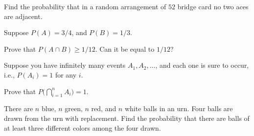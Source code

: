 \begin{problem}[Handout 2, \# 16]
  Find the probability that in a random arrangement of \(52\) bridge card
  no two aces are adjacent.
\end{problem}
\begin{solution*}
\end{solution*}

\begin{problem}[Handout 2, \# 17]
  Suppose \(P(A)=3/4\), and \(P(B)=1/3\).

  \noindent Prove that \(P(A\cap B)\geq 1/12\). Can it be equal to \(1/12\)?
\end{problem}
\begin{solution*}
\end{solution*}

\begin{problem}[Handout 2, \# 18]
  Suppose you have infinitely many events \(A_1,A_2,\dotsc\), and each one
  is sure to occur, i.e., \(P(A_i)=1\) for any \(i\).

  \noindent Prove that \(P\bigl(\bigcap_{i=1}^n A_i\bigr)=1\).
\end{problem}
\begin{solution*}
\end{solution*}

\begin{problem}[Handout 2, \# 19]
  There are \(n\) blue, \(n\) green, \(n\) red, and \(n\) white balls in an
  urn. Four balls are drawn from the urn with replacement. Find the
  probability that there are balls of at least three different colors among
  the four drawn.
\end{problem}
\begin{solution*}
\end{solution*}


